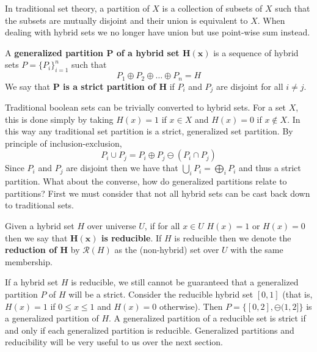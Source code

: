 In traditional set theory, a partition of $X$ is a collection of subsets of $X$ such that 
the subsets are mutually disjoint and their union is equivalent to $X$.
When dealing with hybrid sets we no longer have union but use point-wise sum instead.


\begin{definition}
	A \textbf{generalized partition $\boldsymbol{P}$ of a hybrid set $\boldsymbol{H(x)}$} is a sequence of hybrid sets
	$P=\{P_i \}_{i=1}^n$ such that
	\begin{equation}
		P_1 \oplus P_2 \oplus \ldots \oplus P_n = H
	\end{equation}
	We say that \textbf{$\boldsymbol{P}$ is a strict partition of $\boldsymbol{H}$} if 
	$P_i$ and $P_j$ are disjoint for all $i \neq j$.
\end{definition}


Traditional boolean sets can be trivially converted to hybrid sets.
For a set $X$, this is done simply by taking $H(x)=1$ if $x \in X$ and $H(x)=0$ if $x \notin X$.
In this way any traditional set partition is a strict, generalized set partition.
By principle of inclusion-exclusion, 
\begin{equation*}
	P_i \cup P_j = P_i \oplus P_j \ominus (P_i \cap P_j)
\end{equation*}
Since $P_i$ and $P_j$ are disjoint then we have that $\bigcup_i P_i = \bigoplus_i P_i$ and thus a strict partition.
What about the converse, how do generalized partitions relate to partitions?
First we must consider that not all hybrid sets can be cast back down to traditional sets.


\begin{definition}
	Given a hybrid set $H$ over universe $U$, 
	if for all $x \in U$ $H(x)=1$ or $H(x)=0$ then we say that \textbf{$\boldsymbol{H(x)}$ is reducible}.
	If $H$ is reducible then we denote the \textbf{reduction of $\boldsymbol{H}$} by $\mathcal{R}(H)$ 
	as the (non-hybrid) set over $U$ with the same membership.  
\end{definition}


If a hybrid set $H$ is reducible, we still cannot be guaranteed that a generalized partition $P$ of $H$ will be a strict.
Consider the reducible hybrid set $[0,1]$ (that is, $H(x)=1$ if $0 \leq x \leq 1$ and $H(x)=0$ otherwise).
Then $P = \big\{ [0,2], \ominus (1,2] \big\}$ is a generalized partition of $H$. 
A generalized partition of a reducible set is strict if and only if each generalized partition is reducible.
Generalized partitions and reducibility will be very useful to us over the next section.





